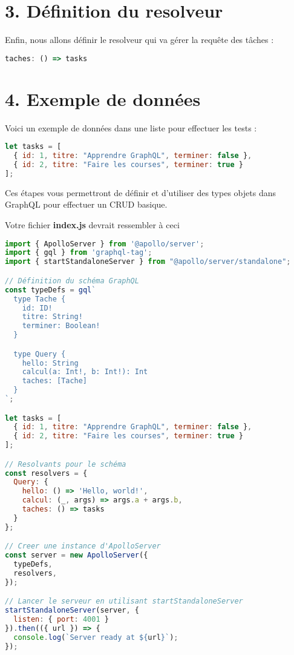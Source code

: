 \documentclass{article}
\begin{document}
\section*{3. Définition du resolveur}

Enfin, nous allons définir le resolveur qui va gérer la requête des tâches :

\begin{lstlisting}[language=JavaScript]
taches: () => tasks
\end{lstlisting}

\section*{4. Exemple de données}

Voici un exemple de données dans une liste pour effectuer les tests :

\begin{lstlisting}[language=JavaScript]
let tasks = [
  { id: 1, titre: "Apprendre GraphQL", terminer: false },
  { id: 2, titre: "Faire les courses", terminer: true }
];
\end{lstlisting}

Ces étapes vous permettront de définir et d'utiliser des types objets dans GraphQL pour effectuer un CRUD basique. 

Votre fichier \textbf{index.js} devrait ressembler à ceci 

\begin{lstlisting}[language=JavaScript]
import { ApolloServer } from '@apollo/server';
import { gql } from 'graphql-tag';
import { startStandaloneServer } from "@apollo/server/standalone"; 

// Définition du schéma GraphQL
const typeDefs = gql`
  type Tache {
    id: ID!
    titre: String!
    terminer: Boolean!
  }

  type Query {
    hello: String
    calcul(a: Int!, b: Int!): Int
    taches: [Tache]
  }
`;

let tasks = [
  { id: 1, titre: "Apprendre GraphQL", terminer: false },
  { id: 2, titre: "Faire les courses", terminer: true }
];

// Resolvants pour le schéma
const resolvers = {
  Query: {
    hello: () => 'Hello, world!',
    calcul: (_, args) => args.a + args.b,
    taches: () => tasks
  }
};

// Creer une instance d'ApolloServer
const server = new ApolloServer({
  typeDefs,
  resolvers,
});

// Lancer le serveur en utilisant startStandaloneServer
startStandaloneServer(server, {
  listen: { port: 4001 }
}).then(({ url }) => {
  console.log(`Server ready at ${url}`);
});
\end{lstlisting}
\end{document}
